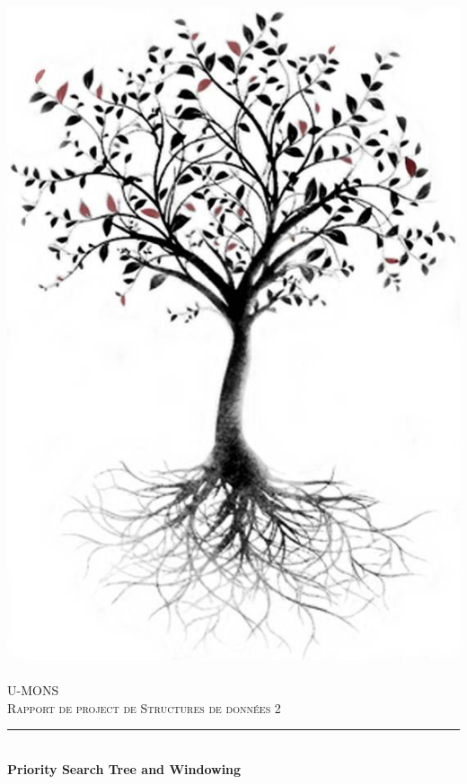 \documentclass[10pt,a4paper]{article}
\newcommand{\HRule}{\rule{\linewidth}{0.5mm}}
\begin{document}
\begin{titlepage}
  \begin{sffamily}
  \begin{center}

    \includegraphics[scale=0.15]{images/tree.jpg}~\\[1.5cm]

    \textsc{\LARGE U-MONS}\\[2cm]

    \textsc{\Large Rapport de project de Structures de données 2}\\[1.5cm]

    \HRule \\[0.4cm]
    { \huge \bfseries Priority Search Tree and Windowing\\[0.4cm] }


\end{center}
\end{sffamily}
\end{titlepage}
\end{document}
